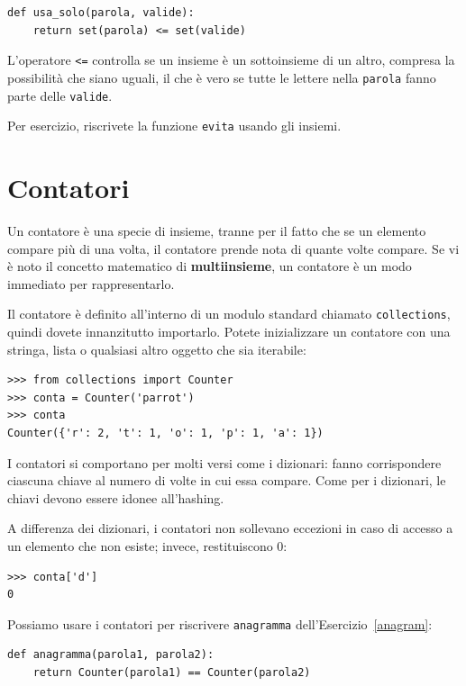 \documentclass[10pt]{book}
\begin{document}
\begin{verbatim}
def usa_solo(parola, valide):
    return set(parola) <= set(valide)
\end{verbatim}
%
L'operatore \verb"<=" controlla se un insieme è un sottoinsieme di un altro, compresa la possibilità che siano uguali, il che è vero se tutte le lettere nella {\tt parola} fanno parte delle {\tt valide}.

Per esercizio, riscrivete la funzione \verb"evita" usando gli insiemi.


\section{Contatori}

Un contatore è una specie di insieme, tranne per il fatto che se un elemento compare più di una volta, il contatore prende nota di quante volte compare. Se vi è noto il concetto matematico di {\bf multiinsieme}, un contatore è un modo immediato per rappresentarlo.

Il contatore è definito all'interno di un modulo standard chiamato {\tt collections}, quindi dovete innanzitutto importarlo. Potete inizializzare un contatore con una stringa, lista o qualsiasi altro oggetto che sia iterabile:

\begin{verbatim}
>>> from collections import Counter
>>> conta = Counter('parrot')
>>> conta
Counter({'r': 2, 't': 1, 'o': 1, 'p': 1, 'a': 1})
\end{verbatim}

I contatori si comportano per molti versi come i dizionari: fanno corrispondere ciascuna chiave al numero di volte in cui essa compare. Come per i dizionari, le chiavi devono essere idonee all'hashing.

A differenza dei dizionari, i contatori non sollevano eccezioni in caso di accesso a un elemento che non esiste; invece, restituiscono 0:

\begin{verbatim}
>>> conta['d']
0
\end{verbatim}

Possiamo usare i contatori per riscrivere \verb"anagramma" dell'Esercizio~\ref{anagram}:

\begin{verbatim}
def anagramma(parola1, parola2):
    return Counter(parola1) == Counter(parola2)
\end{verbatim}
\end{document}
